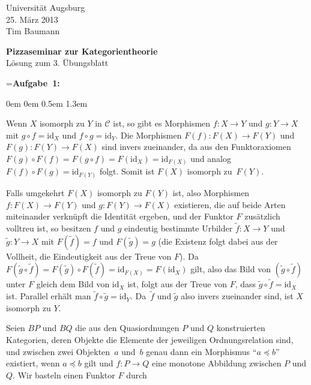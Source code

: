 \documentclass[a4paper,ngerman]{scrartcl}
\theoremstyle{definition}
\theoremstyle{plain}
\theoremstyle{remark}
\newcommand{\C}{\mathcal{C}}
\newcommand{\id}{\mathrm{id}}
\begin{document}
\vspace*{-4em}
\begin{flushright}Universität Augsburg \\ 25. März 2013 \\ Tim Baumann\end{flushright}

\begin{center}\Large \textbf{Pizzaseminar zur Kategorientheorie} \\
Lösung zum 3. Übungsblatt
\end{center}
\vspace{2em}

\newbox{\mybox}
\setbox\mybox=\hbox{\textbf{Aufgabe 1:}}

\begin{list}{}{0em \leftmargin0em \itemindent0.5em \itemsep 1.3em}
\item[\textbf{Aufgabe 1:}]\mbox{}

Wenn $X$ isomorph zu $Y$ in $\C$ ist, so gibt es Morphismen $f : X \to Y$ und $g : Y \to X$ mit $g \circ f = \id_X$ und $f \circ g = \id_Y$.
Die Morphismen $F(f):F(X) \to F(Y)$ und $F(g):F(Y) \to F(X)$ sind invers zueinander, da aus den Funktoraxiomen $F(g) \circ F(f) = F(g \circ f) = F(\id_X) = \id_{F(X)}$ und analog
$F(f) \circ F(g) = \id_{F(Y)}$ folgt. Somit ist $F(X)$ isomorph zu~$F(Y)$.

Falls umgekehrt $F(X)$ isomorph zu $F(Y)$ ist, also Morphismen $f : F(X) \to F(Y)$ und $g : F(Y) \to F(X)$ existieren, die auf beide Arten miteinander verknüpft die Identität ergeben, und der Funktor $F$ zusätzlich volltreu ist, so besitzen $f$ und $g$ eindeutig bestimmte Urbilder $\widetilde{f} : X \to Y$ und $\widetilde{g} : Y \to X$ mit $F(\widetilde{f}) = f$ und $F(\widetilde{g}) = g$ (die Existenz folgt dabei aus der Vollheit, die Eindeutigkeit aus der Treue von $F$). Da
$F(\widetilde{g} \circ \widetilde{f}) = F(\widetilde{g}) \circ F(\widetilde{f}) = \id_{F(X)} = F(\id_X)$ gilt, also das Bild von $(\widetilde{g} \circ \widetilde{f})$ unter $F$ gleich dem Bild von $\id_X$ ist, folgt aus der Treue von $F$, dass $\widetilde{g} \circ \widetilde{f} = \id_X$ ist. Parallel erhält man $\widetilde{f} \circ \widetilde{g} = \id_Y$. Da~$\widetilde{f}$ und $\widetilde{g}$ also invers zueinander sind, ist $X$ isomorph zu $Y$.

\item[\textbf{Aufgabe 2:}]\mbox{}

Seien $BP$ und $BQ$ die aus den Quasiordnungen $P$ und $Q$ konstruierten Kategorien, deren Objekte die Elemente der jeweiligen Ordnungsrelation sind, und zwischen zwei Objekten~$a$ und~$b$ genau dann ein Morphismus "`$a \preceq b$"' existiert, wenn $a \preceq b$ gilt und $f:P \to Q$ eine monotone Abbildung zwischen $P$ und $Q$.
Wir basteln einen Funktor $F$ durch


\end{list}
\end{document}
